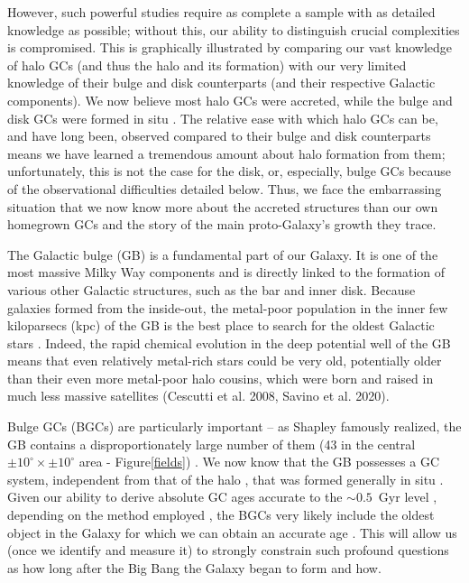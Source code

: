 \documentclass[onecolumn]{aa}
\begin{document}
However, such powerful studies require as complete a sample with as detailed knowledge as possible; without this, our ability to distinguish crucial complexities is compromised. This is graphically illustrated by comparing our vast knowledge of halo GCs (and thus the halo and its formation) with our very limited knowledge of their bulge and disk counterparts (and their respective Galactic components). 
We now believe most halo GCs were accreted, while the bulge and disk GCs were formed in situ \citep{Barbuy2018, Massari2019}. The relative ease with which halo GCs can be, and have long been, observed compared to their bulge and disk counterparts means we have learned a tremendous amount about halo formation from them; unfortunately, this is not the case for the disk, or, especially, bulge GCs because of the observational difficulties detailed below. Thus, we face the embarrassing situation that we now know more about the accreted structures than our own homegrown GCs and the story of the main proto-Galaxy's growth they trace. 

The Galactic bulge (GB)  is a fundamental part of our Galaxy. It is one of the most massive Milky Way components and is directly linked to the formation of various other Galactic structures, such as the bar and inner disk. Because galaxies formed from the inside-out, the metal-poor population in the inner few kiloparsecs (kpc) of the GB is the best place to search for the oldest Galactic stars  \citep{Tumlinson2010, Carollo2016, Fragkoudi2020, Horta2021}. Indeed, the rapid chemical evolution in the deep potential well of the GB means that even relatively metal-rich stars could be very old, potentially older than their even more metal-poor halo cousins, which were born and raised in much less massive satellites (Cescutti et al. 2008, Savino et al. 2020).

Bulge GCs (BGCs) are particularly important -- as Shapley famously realized, the GB contains a disproportionately large number of them (43 in the central $\pm 10^\circ \times \pm 10^\circ $ area - Figure\ref{fields}) \citep[][2010 edition; hereafter H10]{Harris1996}. We now know that the GB possesses a GC system, independent from that of the halo \citep{Minniti1995a}, that was formed generally in situ \citep{Tissera2017, Massari2019}. Given our ability to derive absolute GC ages  accurate to the $\sim 0.5$~Gyr level \citep[e.g.,][]{Saracino2016}, depending on the method employed \citep[see][for a recent review]{Catelan2018}, the BGCs very likely include the oldest object in the Galaxy for which we can obtain an accurate age \citep{Dias2016, Barbuy2018, Kerber2019}. This will allow us (once we identify and measure it) to strongly constrain such profound questions as how long after the Big Bang the Galaxy began to form and how.
\end{document}
